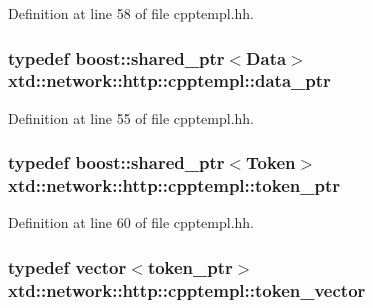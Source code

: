 Definition at line 58 of file cpptempl.\+hh.

\subsubsection[{\texorpdfstring{data\+\_\+ptr}{data_ptr}}]{\setlength{\rightskip}{0pt plus 5cm}typedef boost\+::shared\+\_\+ptr$<${\bf Data}$>$ {\bf xtd\+::network\+::http\+::cpptempl\+::data\+\_\+ptr}}\hypertarget{namespacextd_1_1network_1_1http_1_1cpptempl_ad2f49991f1902699a98cf62bf0ae7ce6}{}\label{namespacextd_1_1network_1_1http_1_1cpptempl_ad2f49991f1902699a98cf62bf0ae7ce6}


Definition at line 55 of file cpptempl.\+hh.

\subsubsection[{\texorpdfstring{token\+\_\+ptr}{token_ptr}}]{\setlength{\rightskip}{0pt plus 5cm}typedef boost\+::shared\+\_\+ptr$<${\bf Token}$>$ {\bf xtd\+::network\+::http\+::cpptempl\+::token\+\_\+ptr}}\hypertarget{namespacextd_1_1network_1_1http_1_1cpptempl_a09d1bd238d03342e60f0c20c679c0c88}{}\label{namespacextd_1_1network_1_1http_1_1cpptempl_a09d1bd238d03342e60f0c20c679c0c88}


Definition at line 60 of file cpptempl.\+hh.

\subsubsection[{\texorpdfstring{token\+\_\+vector}{token_vector}}]{\setlength{\rightskip}{0pt plus 5cm}typedef vector$<${\bf token\+\_\+ptr}$>$ {\bf xtd\+::network\+::http\+::cpptempl\+::token\+\_\+vector}}\hypertarget{namespacextd_1_1network_1_1http_1_1cpptempl_a38606cfbbfe81ed46ea9b0cf064de956}{}\label{namespacextd_1_1network_1_1http_1_1cpptempl_a38606cfbbfe81ed46ea9b0cf064de956}


